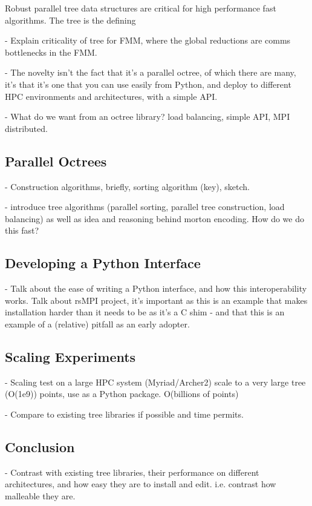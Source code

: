 Robust parallel tree data structures are critical for high performance fast algorithms. The tree is the defining 

- Explain criticality of tree for FMM, where the global reductions are comms bottlenecks in the FMM.

- The novelty isn't the fact that it's a parallel octree, of which there are many, it's that it's one that you can use easily from Python, and deploy to different HPC environments and architectures, with a simple API.

- What do we want from an octree library? load balancing, simple API, MPI distributed.

\subsection*{Parallel Octrees}

- Construction algorithms, briefly, sorting algorithm (key), sketch.

- introduce tree algorithms (parallel sorting, parallel tree construction, load balancing) as well as idea and reasoning behind morton encoding. How do we do this fast? 

\subsection*{Developing a Python Interface}
- Talk about the ease of writing a Python interface, and how this interoperability works. Talk about rsMPI project, it's important as this is an example that makes installation harder than it needs to be as it's a C shim - and that this is an example of a (relative) pitfall as an early adopter.

\subsection*{Scaling Experiments}

- Scaling test on a large HPC system (Myriad/Archer2) scale to a very large tree (O(1e9)) points, use as a Python package.  O(billions of points)

- Compare to existing tree libraries if possible and time permits.

\subsection*{Conclusion}

- Contrast with existing tree libraries, their performance on different architectures, and how easy they are to install and edit. i.e. contrast how malleable they are.
